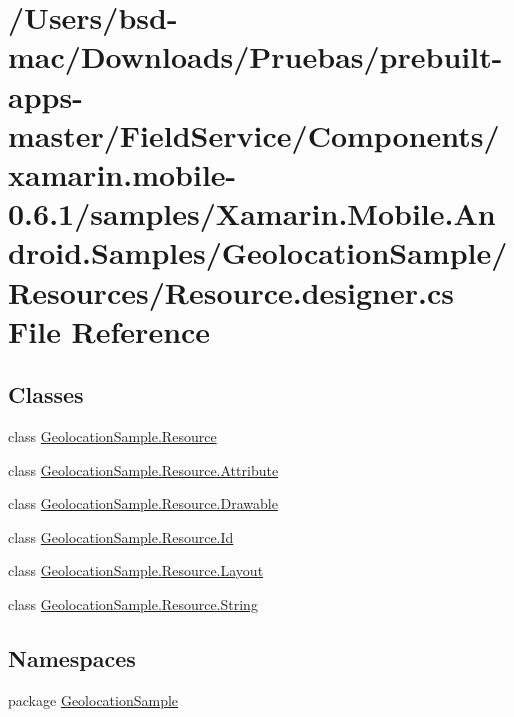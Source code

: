 \hypertarget{_components_2xamarin_8mobile-0_86_81_2samples_2_xamarin_8_mobile_8_android_8_samples_2_geolocati70c310c330f4a850881b004033a4fa1f}{\section{/\+Users/bsd-\/mac/\+Downloads/\+Pruebas/prebuilt-\/apps-\/master/\+Field\+Service/\+Components/xamarin.mobile-\/0.6.1/samples/\+Xamarin.Mobile.\+Android.\+Samples/\+Geolocation\+Sample/\+Resources/\+Resource.designer.\+cs File Reference}
\label{_components_2xamarin_8mobile-0_86_81_2samples_2_xamarin_8_mobile_8_android_8_samples_2_geolocati70c310c330f4a850881b004033a4fa1f}
}
\subsection*{Classes}
\begin{DoxyCompactItemize}
\item 
class \hyperlink{class_geolocation_sample_1_1_resource}{Geolocation\+Sample.\+Resource}
\item 
class \hyperlink{class_geolocation_sample_1_1_resource_1_1_attribute}{Geolocation\+Sample.\+Resource.\+Attribute}
\item 
class \hyperlink{class_geolocation_sample_1_1_resource_1_1_drawable}{Geolocation\+Sample.\+Resource.\+Drawable}
\item 
class \hyperlink{class_geolocation_sample_1_1_resource_1_1_id}{Geolocation\+Sample.\+Resource.\+Id}
\item 
class \hyperlink{class_geolocation_sample_1_1_resource_1_1_layout}{Geolocation\+Sample.\+Resource.\+Layout}
\item 
class \hyperlink{class_geolocation_sample_1_1_resource_1_1_string}{Geolocation\+Sample.\+Resource.\+String}
\end{DoxyCompactItemize}
\subsection*{Namespaces}
\begin{DoxyCompactItemize}
\item 
package \hyperlink{namespace_geolocation_sample}{Geolocation\+Sample}
\end{DoxyCompactItemize}
